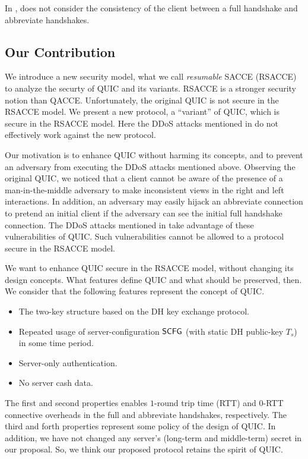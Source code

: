 In \cite{LJBN15:QUIC}, 
 does not
consider the consistency of the client between a full
handshake and abbreviate handshakes.
\fi
\subsection{Our Contribution} \label{sec:proposal}
We introduce a new security model, what we call \textit{resumable} SACCE
(RSACCE) to analyze the securty of QUIC and its variants. 
RSACCE is a stronger security notion than QACCE. 
Unfortunately, the original QUIC is not secure in the RSACCE model. 
We present a new protocol, a ``variant'' of QUIC, which is secure in the RSACCE model. 
Here the DDoS attacks mentioned in \cite{LJBN15:QUIC} do not effectively work against the new protocol.

Our motivation is to enhance QUIC without harming its concepts, and to prevent an adversary from executing the DDoS attacks mentioned above. 
Observing the original QUIC, we noticed  that 
a client cannot be aware of the presence of a man-in-the-middle adversary to make inconsistent views 
in the right and left interactions.
In addition, an adversary may easily hijack an abbreviate connection to pretend an initial client 
if the adversary can see the initial full handshake connection. 
The DDoS attacks mentioned in \cite{LJBN15:QUIC} take advantage of these vulnerabilities of QUIC. 
Such vulnerabilities cannot be allowed to a protocol secure in the RSACCE model. 

We want to enhance QUIC secure in the RSACCE model, without changing its design concepts.
What features define QUIC and what should be preserved, then. 
We consider that the following features represent the concept of QUIC.

\begin{itemize}
\item The two-key structure based on the DH key exchange protocol. 
\item Repeated usage of server-configuration $\mathsf{SCFG}$ (with static DH public-key $T_s$) in some time period. 
\item Server-only authentication. 
\item No server cash data.
\end{itemize}

The  first and second properties enables 
$1$-round trip time (RTT) and $0$-RTT connective overheads in the full and abbreviate handshakes, respectively. 
The third and forth properties represent some policy of the design of QUIC. 
In addition, we have not changed any server's (long-term and middle-term) secret in our proposal.   
So, we think our proposed protocol retains the spirit of QUIC. 


